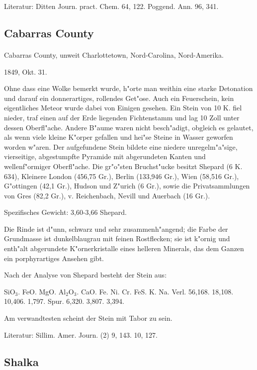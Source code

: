 \documentclass[a4paper, 11pt, oneside]{article}
\begin{document}
\footnotesize
Literatur: Ditten Journ. pract. Chem. 64, 122. Poggend. Ann. 96, 341.

\subsection{Cabarras County}
\normalsize
\paragraph{}
Cabarras County, unweit Charlottetown, Nord-Carolina, Nord-Amerika.

1849, Okt. 31.

Ohne dass eine Wolke bemerkt wurde, h"orte man weithin eine starke Detonation und darauf ein donnerartiges, rollendes Get"ose. Auch ein Feuerschein, kein eigentliches Meteor wurde dabei von Einigen gesehen. Ein Stein von 10 K. fiel nieder, traf einen auf der Erde liegenden Fichtenstamm und lag 10 Zoll unter dessen Oberfl"ache. Andere B"aume waren nicht besch"adigt, obgleich es gelautet, als wenn viele kleine K"orper gefallen und hei"se Steine in Wasser geworfen worden w"aren. Der aufgefundene Stein bildete eine niedere unregelm"a"sige, vierseitige, abgestumpfte Pyramide mit abgerundeten Kanten und wellenf"ormiger Oberfl"ache. Die gr"o"sten Bruchst"ucke besitzt Shepard (6 K. 634), Kleinere London (456,75 Gr.), Berlin (133,946 Gr.), Wien (58,516 Gr.), G"ottingen (42,1 Gr.), Hudson und Z"urich (6 Gr.), sowie die Privatsammlungen von Gres (82,2 Gr.), v. Reichenbach, Nevill und Auerbach (16 Gr.).

Spezifisches Gewicht: 3,60-3,66 Shepard.

Die Rinde ist d"unn, schwarz und sehr zusammenh"angend; die Farbe der Grundmasse ist dunkelblaugrau mit feinen Rostflecken; sie ist k"ornig und enth"alt abgerundete K"ornerkristalle eines helleren Minerals, das dem Ganzen ein porphyrartiges Ansehen gibt.

Nach der Analyse von Shepard besteht der Stein aus:

SiO$_{3}$. FeO. MgO. Al$_{2}$O$_{3}$. CaO. {Fe. Ni. Cr.} FeS. {K. Na. Verl.}  
56,168. 18,108. 10,406. 1,797. Spur. 6,320. 3,807. 3,394.

Am verwandtesten scheint der Stein mit Tabor zu sein.

\footnotesize
Literatur: Sillim. Amer. Journ. (2) 9, 143. 10, 127.

\subsection{Shalka}
\normalsize
\end{document}
